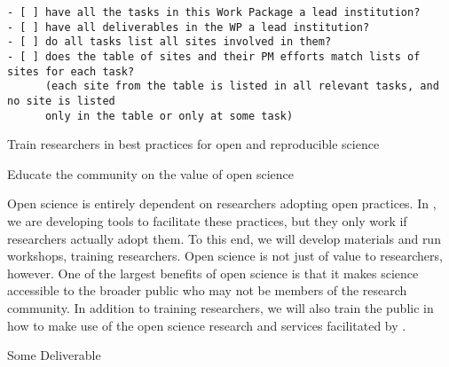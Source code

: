\begin{draft}
\begin{verbatim}
- [ ] have all the tasks in this Work Package a lead institution?
- [ ] have all deliverables in the WP a lead institution?
- [ ] do all tasks list all sites involved in them?
- [ ] does the table of sites and their PM efforts match lists of sites for each task?
      (each site from the table is listed in all relevant tasks, and no site is listed
      only in the table or only at some task)
\end{verbatim}
\end{draft}

\begin{workpackage}[id=education,wphases=0-48,swsites,
  title=Education and Dissemination,
  short=Education,
  lead=SRL,
  SRLRM=16,
  UPSUDRM=4,
  XFELRM=4,
]
\begin{wpobjectives}
 \begin{compactitem}
   \item Train researchers in best practices for open and reproducible science
   \item Educate the community on the value of open science
 \end{compactitem}
\end{wpobjectives}

\begin{wpdescription}

Open science is entirely dependent on researchers adopting open practices.
In \TheProject, we are developing tools to facilitate these practices,
but they only work if researchers actually adopt them.
To this end, we will develop materials and run workshops,
training researchers.
Open science is not just of value to researchers, however.
One of the largest benefits of open science is that it makes science accessible to the broader public
who may not be members of the research community.
In addition to training researchers,
we will also train the public in how to make use of the open science research and services facilitated by \TheProject.

\end{wpdescription}

\begin{tasklist}
% 

\end{tasklist}




\begin{wpdelivs}
\begin{wpdeliv}[due=1,miles=startup,id=infrastructure,dissem=PU,nature=DEC,lead=SRL]
  {Some Deliverable}
\end{wpdeliv}

\end{wpdelivs}
\end{workpackage}

